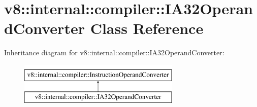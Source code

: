 \hypertarget{classv8_1_1internal_1_1compiler_1_1IA32OperandConverter}{}\section{v8\+:\+:internal\+:\+:compiler\+:\+:I\+A32\+Operand\+Converter Class Reference}
\label{classv8_1_1internal_1_1compiler_1_1IA32OperandConverter}
Inheritance diagram for v8\+:\+:internal\+:\+:compiler\+:\+:I\+A32\+Operand\+Converter\+:\begin{figure}[H]
\begin{center}
\leavevmode
\includegraphics[height=2.000000cm]{classv8_1_1internal_1_1compiler_1_1IA32OperandConverter}
\end{center}
\end{figure}
